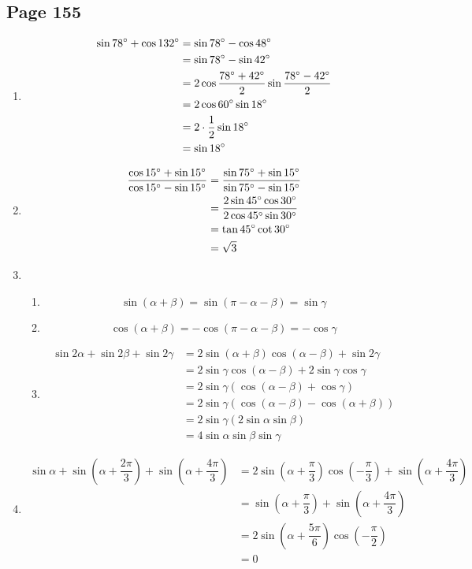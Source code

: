 \documentclass{article}
\newenvironment{solutions}[1]
{\subsection*{#1}
 \begin{enumerate}[leftmargin=1.5em]}
{\end{enumerate}}
\newcommand{\solution}{\item}
\newenvironment{subsolutions}
{\begin{enumerate}}
{\end{enumerate}}
\newcommand{\subsolution}{\item}
\begin{document}
\begin{solutions}{Page 155}
\solution %
\begin{align*}
\sin{78\degree} + \cos{132\degree} &= \sin{78\degree} - \cos{48\degree} \\
&= \sin{78\degree} - \sin{42\degree} \\
&= 2\cos{\dfrac{78\degree+42\degree}{2}}\sin{\dfrac{78\degree-42\degree}{2}} \\
&= 2\cos{60\degree}\sin{18\degree} \\
&= 2\cdot \dfrac{1}{2}\sin{18\degree} \\
&= \sin{18\degree}
\end{align*}

\solution %
\begin{align*}
\dfrac{\cos{15\degree}+\sin{15\degree}}{\cos{15\degree}-\sin{15\degree}} &= \dfrac{\sin{75\degree}+\sin{15\degree}}{\sin{75\degree}-\sin{15\degree}} \\
&= \dfrac{2\sin{45\degree}\cos{30\degree}}{2\cos{45\degree}\sin{30\degree}} \\
&= \tan{45\degree}\cot{30\degree} \\
&= \sqrt{3}
\end{align*}

\solution %
\begin{subsolutions}
\subsolution %
\[
\sin\left(\alpha+\beta\right) = \sin\left(\pi-\alpha-\beta\right) = \sin{\gamma}
\]
\subsolution %
\[
\cos\left(\alpha+\beta\right) = -\cos\left(\pi-\alpha-\beta\right) = -\cos{\gamma}
\]
\subsolution %
\begin{align*}
\sin{2\alpha} + \sin{2\beta} + \sin{2\gamma} &= 2\sin\left(\alpha+\beta\right)\cos\left(\alpha-\beta\right) + \sin{2\gamma} \\
&= 2\sin{\gamma}\cos\left(\alpha-\beta\right) + 2\sin{\gamma}\cos{\gamma} \\
&= 2\sin{\gamma}\left(\cos\left(\alpha-\beta\right) + \cos{\gamma}\right) \\
&= 2\sin{\gamma}\left(\cos\left(\alpha-\beta\right) - \cos\left(\alpha+\beta\right)\right) \\
&= 2\sin{\gamma}\left(2\sin{\alpha}\sin{\beta}\right) \\
&= 4\sin{\alpha}\sin{\beta}\sin{\gamma}
\end{align*}
\end{subsolutions}

\solution %
\begin{align*}
\sin{\alpha} + \sin\left(\alpha+\dfrac{2\pi}{3}\right) + \sin\left(\alpha+\dfrac{4\pi}{3}\right) &= 2\sin\left(\alpha+\dfrac{\pi}{3}\right)\cos\left(-\dfrac{\pi}{3}\right) + \sin\left(\alpha+\dfrac{4\pi}{3}\right) \\
&= \sin\left(\alpha+\dfrac{\pi}{3}\right) + \sin\left(\alpha+\dfrac{4\pi}{3}\right) \\
&= 2\sin\left(\alpha+\dfrac{5\pi}{6}\right)\cos\left(-\dfrac{\pi}{2}\right) \\
&= 0
\end{align*}


\end{solutions}
\end{document}

